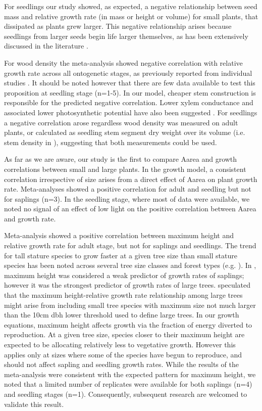 \documentclass[a4paper,11pt]{article}
\begin{document}
For seedlings our study showed, as expected, a negative relationship between seed mass and relative growth rate (in mass or height or volume) for small plants, that dissipated as plants grew larger. This negative relationship arises because seedlings from larger seeds begin life larger themselves, as has been extensively discussed in the literature \citep[reviewed by][]{Turnbull:2012ew}.

For wood density the meta-analysis showed negative correlation with relative growth rate across all ontogenetic stages, as previously reported from individual studies \citep{Wright:2010tp,Ruger:2012jv}. It should be noted however that there are few data available to test this proposition at seedling stage (n=1-5). In our model, cheaper stem construction is responsible for the predicted negative correlation. Lower xylem conductance and associated lower photosynthetic potential have also been suggested \citep[reviewed by][]{Chave:2009iy}.
For seedlings a negative correlation arose regardless wood density was measured on adult plants, or calculated as seedling stem segment dry weight over its volume (i.e. stem density in  \citealt{CastroDiez:1998gz}), suggesting that both measurements could be used.

As far as we are aware, our study is the first to compare Aarea and growth correlations between small and large plants. In the growth model, a consistent correlation irrespective of size arises from a direct effect of Aarea on plant growth rate. Meta-analyses showed a positive correlation for adult and seedling but not for saplings (n=3). In the seedling stage, where most of data were available, we noted no signal of an effect of low light on the positive correlation between Aarea and growth rate.

Meta-analysis showed a positive correlation between maximum height and relative growth rate for adult stage, but not for saplings and seedlings. The trend for tall stature species to grow faster at a given tree size than small stature species has been noted across several tree size classes and forest types (e.g. \citealt{Thomas:1996do,Poorter:2008iu,Wright:2010tp,Herault:2011dd,Ruger:2012jv,Iida:2014ep}). In \citet{Wright:2010tp}, maximum height was considered a weak predictor of growth rates of saplings; however it was the strongest predictor of growth rates of large trees. \citet{Poorter:2008iu} speculated that the maximum height-relative growth rate relationship among large trees might arise from including small tree species with maximum size not much larger than the 10cm dbh lower threshold used to define large trees. In our growth equations, maximum height affects growth via the fraction of energy diverted to reproduction. At a given tree size, species closer to their maximum height are expected to be allocating relatively less to vegetative growth. However this applies only at sizes where some of the species have begun to reproduce, and should not affect sapling and seedling growth rates. While the results of the meta-analysis were consistent with the expected pattern for maximum height, we noted that a limited number of replicates were available for both saplings (n=4) and seedling stages (n=1). Consequently, subsequent research are welcomed to validate this result.
\end{document}
